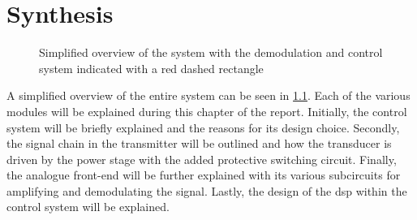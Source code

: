 \chapter{Synthesis} \label{cha:synthesis} %
\begin{figure}[ht]
	\centering
	\resizebox{\textwidth}{!}{
		
	}
	\caption[Simplified overview of the system]{Simplified overview of the system with the demodulation and control system indicated with a red dashed rectangle}
	\label{fig:1_system_overview}
\end{figure}
A simplified overview of the entire system can be seen in \cref{fig:1_system_overview}. Each of the various modules will be explained during this chapter of the report. Initially, the control system will be briefly explained and the reasons for its design choice. Secondly, the signal chain in the transmitter will be outlined and how the transducer is driven by the power stage with the added protective switching circuit. Finally, the analogue front-end will be further explained with its various subcircuits for amplifying and demodulating the signal. Lastly, the design of the \gls{dsp} within the control system will be explained.

